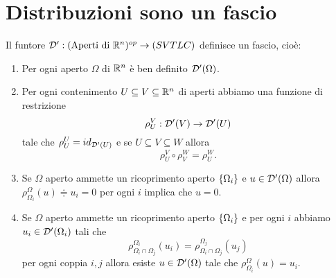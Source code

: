 \section{Distribuzioni sono un fascio}
\begin{proposition}\label{PrDistribuzioniSonoUnFascio}
Il funtore $\mathcal{D}':(\text{Aperti di }\mathbb{R}^n)^{op}\to (SVTLC)$ definisce un fascio, cio\`e:
\begin{enumerate}
    \item Per ogni aperto $\Omega$ di $\mathbb{R}^n$ \`e ben definito $\mathcal{D}'(\Omega)$.
    \item Per ogni contenimento $U\subseteq V\subseteq \mathbb{R}^n$ di aperti abbiamo una funzione di restrizione
    \[\rho^V_U:\mathcal{D}'(V)\to\mathcal{D}'(U)\]
    tale che $\rho^U_U=id_{\mathcal{D}'(U)}$ e se $U\subseteq V\subseteq W$ allora 
    \[\rho^V_U\circ\rho^W_V=\rho^W_U.\]
    \item Se $\Omega$ aperto ammette un ricoprimento aperto $\left\{{\Omega_i}\right\}$ e $u\in \mathcal{D}'(\Omega)$ allora $\rho^\Omega_{\Omega_i}(u)\doteqdot u_i=0$ per ogni $i$ implica che $u=0$.
    \item Se $\Omega$ aperto ammette un ricoprimento aperto $\left\{{\Omega_i}\right\}$ e per ogni $i$ abbiamo $u_i\in \mathcal{D}'(\Omega_i)$ tali che 
    \[\rho^{\Omega_i}_{\Omega_{i}\cap \Omega_j}(u_i)=\rho^{\Omega_j}_{\Omega_{i}\cap \Omega_j}(u_j)\]
    per ogni coppia $i,j$ allora esiste $u\in \mathcal{D}'(\Omega)$ tale che $\rho^\Omega_{\Omega_i}(u)= u_i$.
\end{enumerate}
\end{proposition}
